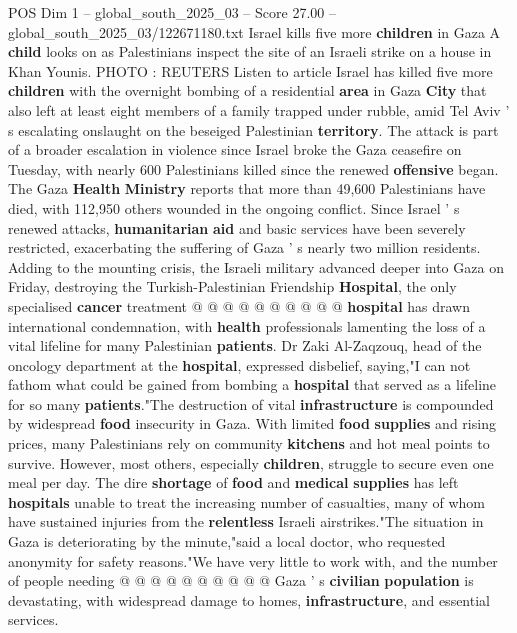 \begin{textsample}{POS Dim 1 – global\_south\_2025\_03 – Score 27.00 – global\_south\_2025\_03/122671180.txt}  \label{ex:f1_pos_269}
Israel kills five more \textbf{children} in Gaza A \textbf{child} looks on as Palestinians inspect the site of an Israeli strike on a house in Khan Younis.
PHOTO : REUTERS Listen to article Israel has killed five more \textbf{children} with the overnight bombing of a residential \textbf{area} in Gaza \textbf{City} that also left at least eight members of a family trapped under rubble, amid Tel Aviv ' s escalating onslaught on the beseiged Palestinian \textbf{territory}.
The attack is part of a broader escalation in violence since Israel broke the Gaza ceasefire on Tuesday, with nearly 600 Palestinians killed since the renewed \textbf{offensive} began.
The Gaza \textbf{Health} \textbf{Ministry} reports that more than 49,600 Palestinians have died, with 112,950 others wounded in the ongoing conflict.
Since Israel ' s renewed attacks, \textbf{humanitarian} \textbf{aid} and basic services have been severely restricted, exacerbating the suffering of Gaza ' s nearly two million residents.
Adding to the mounting crisis, the Israeli military advanced deeper into Gaza on Friday, destroying the Turkish-Palestinian Friendship \textbf{Hospital}, the only specialised \textbf{cancer} treatment @ @ @ @ @ @ @ @ @ @ \textbf{hospital} has drawn international condemnation, with \textbf{health} professionals lamenting the loss of a vital lifeline for many Palestinian \textbf{patients}.
Dr Zaki Al-Zaqzouq, head of the oncology department at the \textbf{hospital}, expressed disbelief, saying,"I can not fathom what could be gained from bombing a \textbf{hospital} that served as a lifeline for so many \textbf{patients}."The destruction of vital \textbf{infrastructure} is compounded by widespread \textbf{food} insecurity in Gaza.
With limited \textbf{food} \textbf{supplies} and rising prices, many Palestinians rely on community \textbf{kitchens} and hot meal points to survive.
However, most others, especially \textbf{children}, struggle to secure even one meal per day.
The dire \textbf{shortage} of \textbf{food} and \textbf{medical} \textbf{supplies} has left \textbf{hospitals} unable to treat the increasing number of casualties, many of whom have sustained injuries from the \textbf{relentless} Israeli airstrikes."The situation in Gaza is deteriorating by the minute,"said a local doctor, who requested anonymity for safety reasons."We have very little to work with, and the number of people needing @ @ @ @ @ @ @ @ @ @ Gaza ' s \textbf{civilian} \textbf{population} is devastating, with widespread damage to homes, \textbf{infrastructure}, and essential services.

\end{textsample}
